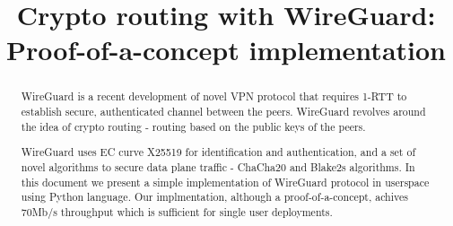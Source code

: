 \documentclass[conference,10pt,letter]{IEEEtran}
\begin{document}
\sloppy
\title{Crypto routing with WireGuard: Proof-of-a-concept implementation}
\maketitle
\begin{abstract}
WireGuard is a recent development of novel VPN protocol that 
requires 1-RTT to establish secure, authenticated channel between
the peers. WireGuard revolves around the idea of crypto routing 
- routing based on the public keys of the peers. 

WireGuard uses EC curve X25519 for identification and authentication,
and a set of novel algorithms to secure data plane traffic - ChaCha20 and Blake2s 
algorithms. In this document we present a simple implementation of WireGuard
protocol in userspace using Python language. Our implmentation, although
a proof-of-a-concept, achives 70Mb/s throughput which is sufficient
for single user deployments.
\end{abstract}

 



%
%
\end{document}
